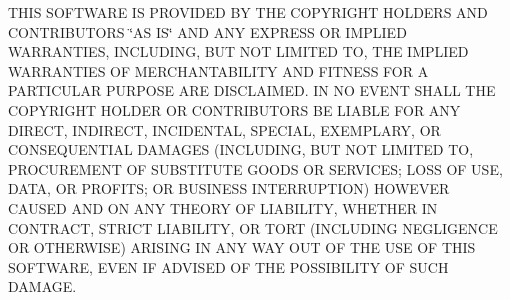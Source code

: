 T\-H\-I\-S S\-O\-F\-T\-W\-A\-R\-E I\-S P\-R\-O\-V\-I\-D\-E\-D B\-Y T\-H\-E C\-O\-P\-Y\-R\-I\-G\-H\-T H\-O\-L\-D\-E\-R\-S A\-N\-D C\-O\-N\-T\-R\-I\-B\-U\-T\-O\-R\-S \char`\"{}\-A\-S I\-S\char`\"{} A\-N\-D A\-N\-Y E\-X\-P\-R\-E\-S\-S O\-R I\-M\-P\-L\-I\-E\-D W\-A\-R\-R\-A\-N\-T\-I\-E\-S, I\-N\-C\-L\-U\-D\-I\-N\-G, B\-U\-T N\-O\-T L\-I\-M\-I\-T\-E\-D T\-O, T\-H\-E I\-M\-P\-L\-I\-E\-D W\-A\-R\-R\-A\-N\-T\-I\-E\-S O\-F M\-E\-R\-C\-H\-A\-N\-T\-A\-B\-I\-L\-I\-T\-Y A\-N\-D F\-I\-T\-N\-E\-S\-S F\-O\-R A P\-A\-R\-T\-I\-C\-U\-L\-A\-R P\-U\-R\-P\-O\-S\-E A\-R\-E D\-I\-S\-C\-L\-A\-I\-M\-E\-D. I\-N N\-O E\-V\-E\-N\-T S\-H\-A\-L\-L T\-H\-E C\-O\-P\-Y\-R\-I\-G\-H\-T H\-O\-L\-D\-E\-R O\-R C\-O\-N\-T\-R\-I\-B\-U\-T\-O\-R\-S B\-E L\-I\-A\-B\-L\-E F\-O\-R A\-N\-Y D\-I\-R\-E\-C\-T, I\-N\-D\-I\-R\-E\-C\-T, I\-N\-C\-I\-D\-E\-N\-T\-A\-L, S\-P\-E\-C\-I\-A\-L, E\-X\-E\-M\-P\-L\-A\-R\-Y, O\-R C\-O\-N\-S\-E\-Q\-U\-E\-N\-T\-I\-A\-L D\-A\-M\-A\-G\-E\-S (I\-N\-C\-L\-U\-D\-I\-N\-G, B\-U\-T N\-O\-T L\-I\-M\-I\-T\-E\-D T\-O, P\-R\-O\-C\-U\-R\-E\-M\-E\-N\-T O\-F S\-U\-B\-S\-T\-I\-T\-U\-T\-E G\-O\-O\-D\-S O\-R S\-E\-R\-V\-I\-C\-E\-S; L\-O\-S\-S O\-F U\-S\-E, D\-A\-T\-A, O\-R P\-R\-O\-F\-I\-T\-S; O\-R B\-U\-S\-I\-N\-E\-S\-S I\-N\-T\-E\-R\-R\-U\-P\-T\-I\-O\-N) H\-O\-W\-E\-V\-E\-R C\-A\-U\-S\-E\-D A\-N\-D O\-N A\-N\-Y T\-H\-E\-O\-R\-Y O\-F L\-I\-A\-B\-I\-L\-I\-T\-Y, W\-H\-E\-T\-H\-E\-R I\-N C\-O\-N\-T\-R\-A\-C\-T, S\-T\-R\-I\-C\-T L\-I\-A\-B\-I\-L\-I\-T\-Y, O\-R T\-O\-R\-T (I\-N\-C\-L\-U\-D\-I\-N\-G N\-E\-G\-L\-I\-G\-E\-N\-C\-E O\-R O\-T\-H\-E\-R\-W\-I\-S\-E) A\-R\-I\-S\-I\-N\-G I\-N A\-N\-Y W\-A\-Y O\-U\-T O\-F T\-H\-E U\-S\-E O\-F T\-H\-I\-S S\-O\-F\-T\-W\-A\-R\-E, E\-V\-E\-N I\-F A\-D\-V\-I\-S\-E\-D O\-F T\-H\-E P\-O\-S\-S\-I\-B\-I\-L\-I\-T\-Y O\-F S\-U\-C\-H D\-A\-M\-A\-G\-E. 

